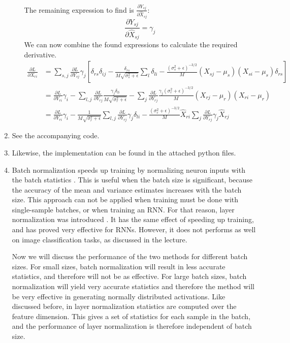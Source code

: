 \documentclass{article}
\newcommand{\pfrac}[2]{\frac{\partial #1}{\partial #2}}
\begin{document}
\begin{enumerate}[label=(\alph*)]
\begin{enumerate}[label=(\roman*)]
$$\begin{aligned}
		\end{aligned}
		$$ The remaining expression to find is $\pfrac{Y_{sj}}{\hat{X}_{sj}}$:
		$$
		\pfrac{Y_{sj}}{\hat{X}_{sj}} = \gamma_j
		$$ We can now combine the found expressions to calculate the required derivative.
		$$
		\begin{aligned}
		\pfrac{L}{X_{ri}} &= \sum_{s,j}\pfrac{L}{Y_{sj}}\gamma_j\left[\delta_{rs}\delta_{ij} -\frac{\delta_{rs}}{M\sqrt{\sigma_s^2 + \epsilon}}\sum_l\delta_{li} - \frac{\left(\sigma_s^2 + \epsilon\right)^{-3 / 2}}{M}\left(X_{sj} - \mu_s\right)\left(X_{si} - \mu_s\right)\delta_{rs}\right] \\ &= \pfrac{L}{Y_{ri}}\gamma_i - \sum_{l,j}\pfrac{L}{Y_{rj}}\frac{\gamma_j\delta_{li}}{M\sqrt{\sigma_r^2 + \epsilon}} - \sum_j\pfrac{L}{Y_{rj}}\frac{\gamma_j\left(\sigma_r^2 + \epsilon\right)^{-3 / 2}}{M}\left(X_{rj} - \mu_r\right)\left(X_{ri} - \mu_r\right) \\ &= \pfrac{L}{Y_{ri}}\gamma_i - \frac{1}{M\sqrt{\sigma_r^2 + \epsilon}}\sum_{l,j}\pfrac{L}{Y_{rj}}\gamma_j\delta_{li} - \frac{\left(\sigma_r^2 + \epsilon\right)^{-3 / 2}}{M}\hat{X}_{ri}\sum_j\pfrac{L}{Y_{rj}}\gamma_j\hat{X}_{rj}
		\end{aligned}
		$$
	\end{enumerate}
	\item
	See the accompanying code.
	\item
	Likewise, the implementation can be found in the attached python files.
	\item
	Batch normalization speeds up training by normalizing neuron inputs with the batch statistics \cite{ioffe2015batch}. This is useful when the batch size is significant, because the accuracy of the mean and variance estimates increases with the batch size. This approach can not be applied when training must be done with single-sample batches, or when training an RNN. For that reason, layer normalization was introduced \cite{ba2016layer}. It has the same effect of speeding up training, and has proved very effective for RNNs. However, it does not performs as well on image classification tasks, as discussed in the lecture.
	
	Now we will discuss the performance of the two methods for different batch sizes. For small sizes, batch normalization will result in less accurate statistics, and therefore will not be as effective. For large batch sizes, batch normalization will yield very accurate statistics and therefore the method will be very effective in generating normally distributed activations. Like discussed before, in layer normalization statistics are computed over the feature dimension. This gives a set of statistics for each sample in the batch, and the performance of layer normalization is therefore independent of batch size. 
\end{enumerate}
\end{document}

